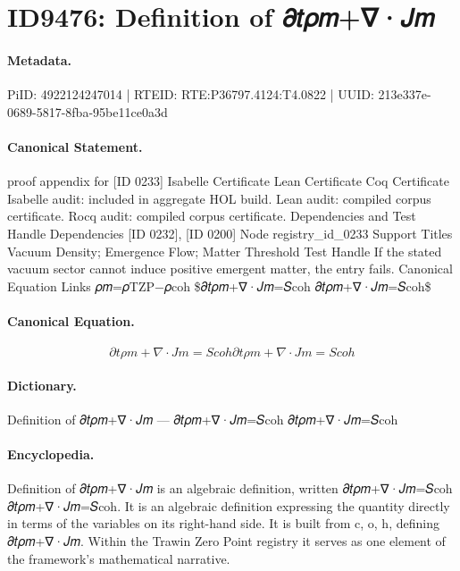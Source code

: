 \section*{ID9476: Definition of 𝜕𝑡𝜌𝑚+∇·𝐽𝑚}
\paragraph{Metadata.}
PiID: 4922124247014 | RTEID: RTE:P36797.4124:T4.0822 | UUID: 213e337e-0689-5817-8fba-95be11ce0a3d

\paragraph{Canonical Statement.}
proof appendix for [ID 0233] Isabelle Certificate Lean Certificate Coq Certificate Isabelle audit: included in aggregate HOL build. Lean audit: compiled corpus certificate. Rocq audit: compiled corpus certificate. Dependencies and Test Handle Dependencies [ID 0232], [ID 0200] Node registry\_id\_0233 Support Titles Vacuum Density; Emergence Flow; Matter Threshold Test Handle If the stated vacuum sector cannot induce positive emergent matter, the entry fails. Canonical Equation Links 𝜌𝑚=𝜌TZP−𝜌coh \$𝜕𝑡𝜌𝑚+∇·𝐽𝑚=𝑆coh 𝜕𝑡𝜌𝑚+∇·𝐽𝑚=𝑆coh\$

\paragraph{Canonical Equation.}
\[
𝜕𝑡𝜌𝑚+∇·𝐽𝑚=𝑆coh 𝜕𝑡𝜌𝑚+∇·𝐽𝑚=𝑆coh
\]

\paragraph{Dictionary.}
Definition of 𝜕𝑡𝜌𝑚+∇·𝐽𝑚 — 𝜕𝑡𝜌𝑚+∇·𝐽𝑚=𝑆coh 𝜕𝑡𝜌𝑚+∇·𝐽𝑚=𝑆coh

\paragraph{Encyclopedia.}
Definition of 𝜕𝑡𝜌𝑚+∇·𝐽𝑚 is an algebraic definition, written 𝜕𝑡𝜌𝑚+∇·𝐽𝑚=𝑆coh 𝜕𝑡𝜌𝑚+∇·𝐽𝑚=𝑆coh. It is an algebraic definition expressing the quantity directly in terms of the variables on its right-hand side. It is built from c, o, h, defining 𝜕𝑡𝜌𝑚+∇·𝐽𝑚. Within the Trawin Zero Point registry it serves as one element of the framework's mathematical narrative.
